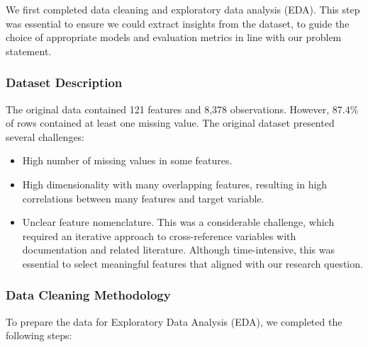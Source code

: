 \documentclass[
  letterpaper,
  DIV=11,
  numbers=noendperiod]{scrartcl}
\begin{document}
We first completed data cleaning and exploratory data analysis (EDA).
This step was essential to ensure we could extract insights from the
dataset, to guide the choice of appropriate models and evaluation
metrics in line with our problem statement.

\subsubsection{Dataset Description}\label{dataset-description}

The original data contained 121 features and 8,378 observations.
However, 87.4\% of rows contained at least one missing value. The
original dataset presented several challenges:

\begin{itemize}
\item
  High number of missing values in some features.
\item
  High dimensionality with many overlapping features, resulting in high
  correlations between many features and target variable.
\item
  Unclear feature nomenclature. This was a considerable challenge, which
  required an iterative approach to cross-reference variables with
  documentation and related literature. Although time-intensive, this
  was essential to select meaningful features that aligned with our
  research question.
\end{itemize}

\subsubsection{Data Cleaning
Methodology}\label{data-cleaning-methodology}

To prepare the data for Exploratory Data Analysis (EDA), we completed
the following steps:
\end{document}
